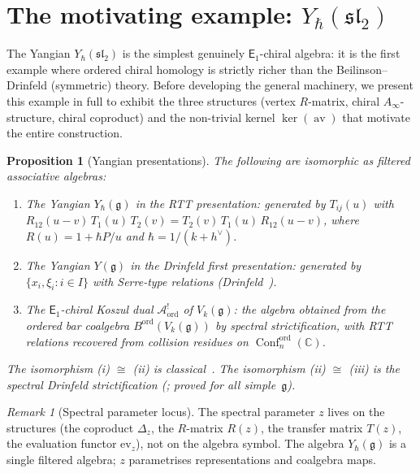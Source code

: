 \documentclass[11pt,reqno]{amsart}
\newtheorem{proposition}[theorem]{Proposition}
\theoremstyle{definition}
\theoremstyle{remark}
\newtheorem{remark}[theorem]{Remark}
\newcommand{\cA}{\mathcal{A}}
\newcommand{\Ainf}{A_{\infty}}
\newcommand{\Eone}{\mathsf{E}_{1}}
\DeclareMathOperator{\Conf}{Conf}
\DeclareMathOperator{\av}{av}
\newcommand{\fg}{\mathfrak{g}}
\newcommand{\CC}{\mathbb{C}}
\numberwithin{equation}{section}
\begin{document}
\section{The motivating example: $Y_\hbar(\mathfrak{sl}_2)$}
\label{sec:yangian-motivating}

The Yangian $Y_\hbar(\mathfrak{sl}_2)$ is the simplest
genuinely $\Eone$-chiral algebra: it is the first example
where ordered chiral homology is strictly richer than the
Beilinson--Drinfeld (symmetric) theory. Before developing
the general machinery, we present this example in full to
exhibit the three structures (vertex $R$-matrix, chiral
$\Ainf$-structure, chiral coproduct) and the non-trivial
kernel $\ker(\av)$ that motivate the entire construction.


\begin{proposition}[Yangian presentations]
\label{prop:yangian-presentations}
The following are isomorphic as filtered associative algebras:
\begin{enumerate}
\item The Yangian $Y_\hbar(\fg)$ in the RTT presentation: generated by $T_{ij}(u)$ with $R_{12}(u-v)\,T_1(u)\,T_2(v) = T_2(v)\,T_1(u)\,R_{12}(u-v)$, where $R(u) = 1 + \hbar P/u$ and $\hbar = 1/(k + h^\vee)$.
\item The Yangian $Y(\fg)$ in the Drinfeld first presentation: generated by $\{x_i, \xi_i : i \in I\}$ with Serre-type relations \textup{(}Drinfeld~\cite{Drinfeld85}\textup{)}.
\item The $\Eone$-chiral Koszul dual $\cA^!_{\mathrm{ord}}$ of $V_k(\fg)$: the algebra obtained from the ordered bar coalgebra $B^{\mathrm{ord}}(V_k(\fg))$ by spectral strictification, with RTT relations recovered from collision residues on $\Conf_n^{\mathrm{ord}}(\CC)$.
\end{enumerate}
The isomorphism \textup{(i)} $\cong$ \textup{(ii)} is classical~\cite{Drinfeld85}. The isomorphism \textup{(ii)} $\cong$ \textup{(iii)} is the spectral Drinfeld strictification \textup{(}\cite[\S III]{Lorgat26I}; proved for all simple~$\fg$\textup{)}.
\end{proposition}

\begin{remark}[Spectral parameter locus]
\label{rem:spectral-parameter-locus}
The spectral parameter $z$ lives on the structures (the coproduct $\Delta_z$, the $R$-matrix $R(z)$, the transfer matrix $T(z)$, the evaluation functor $\mathrm{ev}_z$), not on the algebra symbol.  The algebra $Y_\hbar(\fg)$ is a single filtered algebra; $z$ parametrises representations and coalgebra maps.
\end{remark}
\end{document}
